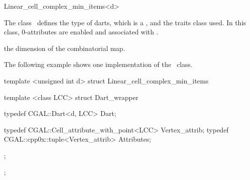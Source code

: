 \ccRefPageBegin

\begin{ccRefClass}{Linear_cell_complex_min_items<d>}


\ccDefinition
  
The class \ccRefName\ defines the type of darts, which is a
, and the traits class used.  In
this class, 0-attributes are enabled and associated with
.

\ccIsModel
{}

\ccParameters
{} the dimension of the combinatorial map.

\ccExample

The following example shows one implementation of the
\ccRefName\ class.

\begin{ccExampleCode}
  template <unsigned int d>
  struct Linear_cell_complex_min_items
  {
    template <class LCC>
    struct Dart_wrapper
    {
      typedef CGAL::Dart<d, LCC> Dart;

      typedef CGAL::Cell_attribute_with_point<LCC> Vertex_attrib;    
      typedef CGAL::cpp0x::tuple<Vertex_attrib> Attributes;
    };
  };
\end{ccExampleCode}

\end{ccRefClass}

\ccSeeAlso
{}\\

\ccRefPageEnd

